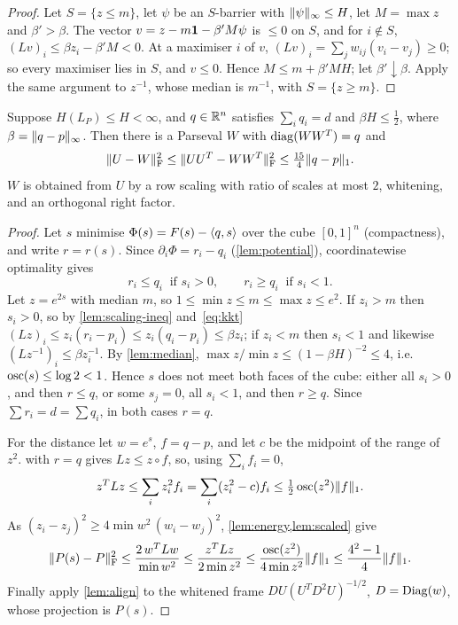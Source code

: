 \begin{proof}
Let $S=\{z\le m\}$, let $\psi$ be an $S$-barrier with $\lVert \psi\rVert_\infty\le H$, let
$M=\max z$ and $\beta'>\beta$. The vector $v=z-m\mathbf 1-\beta'M\psi$ is $\le0$ on
$S$, and for $i\notin S$, $(Lv)_i\le\beta z_i-\beta'M<0$. At a maximiser $i$ of
$v$, $(Lv)_i=\sum_jw_{ij}(v_i-v_j)\ge0$; so every maximiser lies in $S$, and
$v\le0$. Hence $M\le m+\beta'MH$; let $\beta'\downarrow\beta$. Apply the same
argument to $z^{-1}$, whose median is $m^{-1}$, with $S=\{z\ge m\}$.
\end{proof}

\begin{theorem}\label{thm:balancing}
Suppose $H(L_P)\le H<\infty$, and $q\in\mathbb R^n$ satisfies $\sum_iq_i=d$ and
$\beta H\le\frac12$, where $\beta=\lVert q-p\rVert_\infty$. Then
there is a Parseval $W$ with $\operatorname{diag}(WW^T)=q$ and
\[
 \lVert U-W\rVert_{\mathrm F}^2\le\lVert UU^T-WW^T\rVert_{\mathrm F}^2\le\tfrac{15}4\lVert q-p\rVert_1 .
\]
$W$ is obtained from $U$ by a row scaling with ratio of scales at most $2$,
whitening, and an orthogonal right factor.
\end{theorem}

\begin{proof}
Let $s$ minimise $\Phi(s)=F(s)-\langle q,s\rangle$ over the cube $[0,1]^n$ (compactness),
and write $r=r(s)$. Since $\partial_i\Phi=r_i-q_i$ (\cref{lem:potential}),
coordinatewise optimality gives
\begin{equation}\label{eq:kkt}
 r_i\le q_i\ \text{ if }s_i>0,\qquad r_i\ge q_i\ \text{ if }s_i<1 .
\end{equation}
Let $z=e^{2s}$ with median $m$, so $1\le\min z\le m\le\max z\le e^{2}$. If
$z_i>m$ then $s_i>0$, so by \cref{lem:scaling-ineq} and~\eqref{eq:kkt}
$(Lz)_i\le z_i(r_i-p_i)\le z_i(q_i-p_i)\le\beta z_i$; if $z_i<m$ then $s_i<1$
and likewise $(Lz^{-1})_i\le\beta z_i^{-1}$. By \cref{lem:median},
$\max z/\min z\le(1-\beta H)^{-2}\le4$, i.e.\ $\operatorname{osc}(s)\le\log2<1$. Hence
$s$ does not meet both faces of the cube: either all $s_i>0$, and then
$r\le q$, or some $s_j=0$, all $s_i<1$, and then $r\ge q$. Since
$\sum r_i=d=\sum q_i$, in both cases $r=q$.

For the distance let $w=e^{s}$, $f=q-p$, and let $c$ be the midpoint of the
range of $z^2$.  with $r=q$ gives $Lz\le z\circ f$, so,
using $\sum_if_i=0$,
\[
 z^TLz\le\sum_iz_i^2f_i=\sum_i(z_i^2-c)f_i\le\tfrac12\operatorname{osc}(z^2)\lVert f\rVert_1 .
\]
As $(z_i-z_j)^2\ge4\min w^2\,(w_i-w_j)^2$, \cref{lem:energy,lem:scaled} give
\[
 \lVert P(s)-P\rVert_{\mathrm F}^2\le\frac{2\,w^TLw}{\min w^2}\le\frac{z^TLz}{2\min z^2}
 \le\frac{\operatorname{osc}(z^2)}{4\min z^2}\lVert f\rVert_1\le\frac{4^2-1}4\lVert f\rVert_1 .
\]
Finally apply \cref{lem:align} to the whitened frame $DU(U^TD^2U)^{-1/2}$,
$D=\operatorname{Diag}(w)$, whose projection is $P(s)$.
\end{proof}

